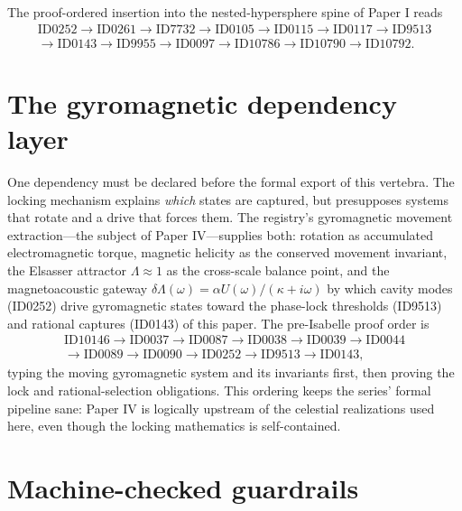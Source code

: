 \documentclass[11pt]{article}
\theoremstyle{remark}
\begin{document}
The proof-ordered insertion into the nested-hypersphere spine of Paper I reads
\begin{equation*}
\begin{gathered}
\text{ID0252} \to \text{ID0261} \to \text{ID7732} \to \text{ID0105} \to \text{ID0115} \to \text{ID0117} \to \text{ID9513} \\
\to \text{ID0143} \to \text{ID9955} \to \text{ID0097} \to \text{ID10786} \to \text{ID10790} \to \text{ID10792}.
\end{gathered}
\end{equation*}

\section{The gyromagnetic dependency layer}
\label{sec:gyro}

One dependency must be declared before the formal export of this vertebra. The locking mechanism explains \emph{which} states are captured, but presupposes systems that rotate and a drive that forces them. The registry's gyromagnetic movement extraction---the subject of Paper IV---supplies both: rotation as accumulated electromagnetic torque, magnetic helicity as the conserved movement invariant, the Elsasser attractor $\Lambda \approx 1$ as the cross-scale balance point, and the magnetoacoustic gateway $\delta\Lambda(\omega) = \alpha U(\omega)/(\kappa + i\omega)$ by which cavity modes (ID0252) drive gyromagnetic states toward the phase-lock thresholds (ID9513) and rational captures (ID0143) of this paper. The pre-Isabelle proof order is
\begin{equation*}
\begin{gathered}
\text{ID10146} \to \text{ID0037} \to \text{ID0087} \to \text{ID0038} \to \text{ID0039} \to \text{ID0044} \\
\to \text{ID0089} \to \text{ID0090} \to \text{ID0252} \to \text{ID9513} \to \text{ID0143},
\end{gathered}
\end{equation*}
typing the moving gyromagnetic system and its invariants first, then proving the lock and rational-selection obligations. This ordering keeps the series' formal pipeline sane: Paper IV is logically upstream of the celestial realizations used here, even though the locking mathematics is self-contained.

\section{Machine-checked guardrails}
\label{sec:wolfram}
\end{document}
